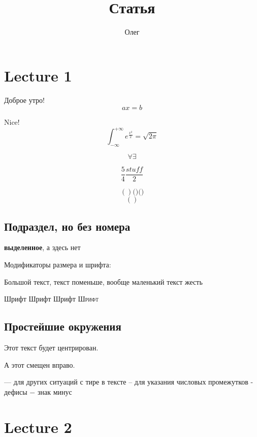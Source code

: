 



    \author{Олег}
    \title{Статья}

    \tableofcontents

    \section{Lecture 1}

    Доброе утро! \[ax = b\]

    Nice!
    \[\int_{-\infty}^{+\infty} e^{\frac{x^2}{2}} = \sqrt{2\pi} \]

    \[ \forall \exists \]

    \[ \frac54 \frac{stuff}2 \]

    \[()  \big( \big) \bigg( \bigg) \]
    \[\left( \right)\]

    \subsection*{Подраздел, но без номера}

    {\bfseries {} выделенное}, а здесь нет

    Модификаторы размера и шрифта:
    
    {\Large Большой текст}, текст поменьше, {\small вообще маленький текст жесть}

    {\rmfamily Шрифт}
    {\sffamily Шрифт}
    {\ttfamily Шрифт}
    {\scshape Шрифт}
    
    \subsection{Простейшие окружения}
    \begin{center}
    Этот текст будет центрирован.
    \end{center}
    \begin{flushright}
        А этот смещен вправо.
    \end{flushright}


    --- для других ситуаций с тире в тексте
    -- для указания числовых промежутков
    - дефисы
    $-$ знак минус

    \section{Lecture 2}

